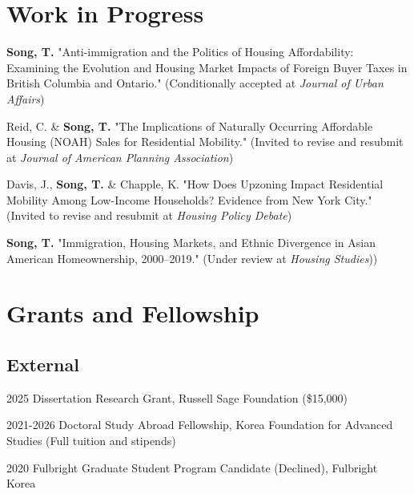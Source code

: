 \documentclass[11pt,letterpaper]{report}
\newcommand{\listitemspace}{0.4em}
\renewenvironment{itemize}
{\begin{list}{}{\setlength{\leftmargin}{0.5em}
\setlength{\parskip}{0em}
\setlength{\itemsep}{\listitemspace}
\setlength{\parsep}{\listitemspace}}}
{\end{list}}
\begin{document}
\section*{Work in Progress}
\begin{itemize}
\setlength{\itemsep}{-0.0em}
\item \textbf{Song, T.} "Anti-immigration and the Politics of Housing Affordability: Examining the Evolution and Housing Market Impacts of Foreign Buyer Taxes in British Columbia and Ontario." (Conditionally accepted at \emph{Journal of Urban Affairs})
\item Reid, C. \& \textbf{Song, T.} "The Implications of Naturally Occurring Affordable Housing (NOAH) Sales for Residential Mobility." (Invited to revise and resubmit at \emph{Journal of American Planning Association})
\item Davis, J., \textbf{Song, T.} \& Chapple, K. "How Does Upzoning Impact Residential Mobility Among Low-Income Households? Evidence from New York City." (Invited to revise and resubmit at \emph{Housing Policy Debate})
\item \textbf{Song, T.} "Immigration, Housing Markets, and Ethnic Divergence in Asian American Homeownership, 2000–2019." (Under review at \emph{Housing Studies}))
\end{itemize}


\section*{Grants and Fellowship}
\subsection*{External}
\begin{tablist}
\item[2025] \tab{}Dissertation Research Grant, Russell Sage Foundation (\$15,000)
\item[2021-2026] \tab{}Doctoral Study Abroad Fellowship, Korea Foundation for Advanced Studies (Full tuition and stipends)
\item[2020] \tab{}Fulbright Graduate Student Program Candidate (Declined), Fulbright Korea
\end{tablist}
\end{document}
